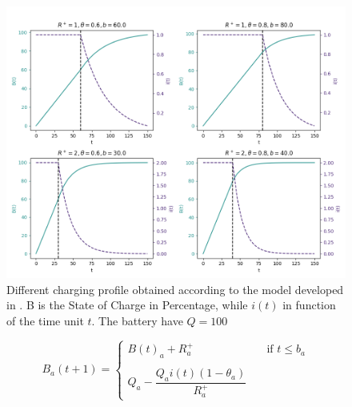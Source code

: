 \begin{figure}[ht]
	\centering
	\includegraphics[width =12.5cm]{assets/img/07_graph_based/R_theta_combinations.png}
	\caption[Different Charging Profiles According To The Model]
	{Different charging profile obtained according to the model developed in . B is the State of Charge in Percentage, while $i(t)$ in function of the time unit $t$. The battery have $Q = 100$ %
	}
	\label{fig:charging_profiles}
\end{figure}
\begin{equation}
	B_a(t+1) = 
	\begin{cases} 
		B(t)_a + R^+_a & \quad \text{if } t \leq  b_a\\
		\\
		Q_a - \dfrac{Q_ai(t)(1-\theta_a)}{R^+_a}
		\end{cases}
		\label{eq:cc_cv}
\end{equation}

